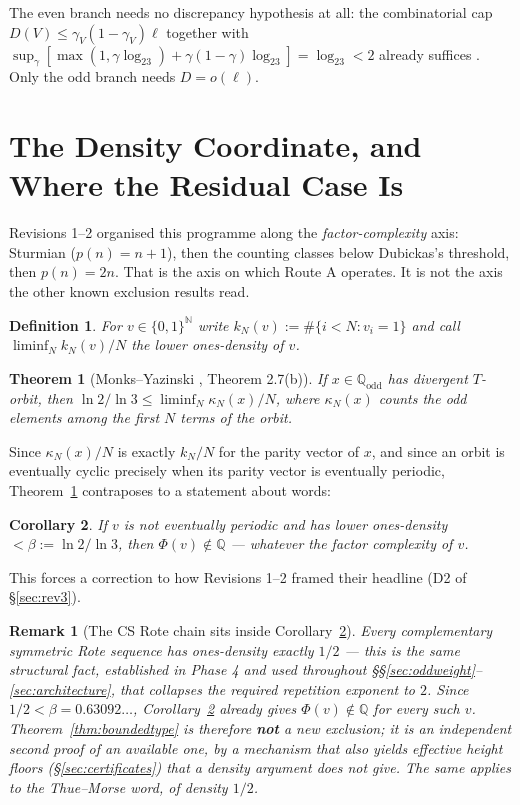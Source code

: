 \documentclass[11pt]{article}
\newtheorem{theorem}{Theorem}[section]
\newtheorem{corollary}[theorem]{Corollary}
\newtheorem*{definition}{Definition}
\newtheorem*{remark}{Remark}
\newcommand{\Q}{\mathbb{Q}}
\newcommand{\N}{\mathbb{N}}
\begin{document}
The even branch needs no discrepancy hypothesis at all: the combinatorial cap
$D(V)\le\gamma_V(1-\gamma_V)\ell$ together with
$\sup_\gamma[\max(1,\gamma\log_23)+\gamma(1-\gamma)\log_23]=\log_23<2$ already suffices
\cite{Phase1Repetition}. Only the odd branch needs $D=o(\ell)$.

\section{The Density Coordinate, and Where the Residual Case Is}
\label{sec:density}

Revisions 1--2 organised this programme along the \emph{factor-complexity} axis: Sturmian
($p(n)=n+1$), then the counting classes below Dubickas's threshold, then $p(n)=2n$. That is the axis
on which Route A operates. It is not the axis the other known exclusion results read.

\begin{definition}
For $v\in\{0,1\}^\N$ write $k_N(v):=\#\{i<N:v_i=1\}$ and call
$\liminf_{N}k_N(v)/N$ the \emph{lower ones-density} of $v$.
\end{definition}

\begin{theorem}[Monks--Yazinski \cite{MonksYazinski2004}, Theorem 2.7(b)]
\label{thm:my}
If $x\in\Q_{\mathrm{odd}}$ has divergent $T$-orbit, then
$\ln2/\ln3\le\liminf_N \kappa_N(x)/N$, where $\kappa_N(x)$ counts the odd elements among the first
$N$ terms of the orbit.
\end{theorem}

Since $\kappa_N(x)/N$ is exactly $k_N/N$ for the parity vector of $x$, and since an orbit is
eventually cyclic precisely when its parity vector is eventually periodic, Theorem~\ref{thm:my}
contraposes to a statement about words:

\begin{corollary}
\label{cor:my}
If $v$ is not eventually periodic and has lower ones-density $<\beta:=\ln2/\ln3$, then
$\Phi(v)\notin\Q$ --- whatever the factor complexity of $v$.
\end{corollary}

This forces a correction to how Revisions 1--2 framed their headline (D2 of \S\ref{sec:rev3}).

\begin{remark}[The CS Rote chain sits inside Corollary~\ref{cor:my}]
Every complementary symmetric Rote sequence has ones-density exactly $1/2$ --- this is the same
structural fact, established in Phase 4 and used throughout \S\S\ref{sec:oddweight}--\ref{sec:architecture},
that collapses the required repetition exponent to $2$. Since $1/2<\beta=0.63092\ldots$,
Corollary~\ref{cor:my} already gives $\Phi(v)\notin\Q$ for every such $v$. Theorem~\ref{thm:boundedtype}
is therefore \textbf{not} a new exclusion; it is an independent second proof of an available one, by a
mechanism that also yields effective height floors (\S\ref{sec:certificates}) that a density argument
does not give. The same applies to the Thue--Morse word, of density $1/2$.
\end{remark}
\end{document}
